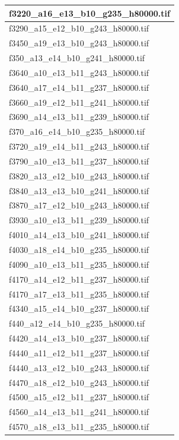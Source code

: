 \documentclass[12pt, twoside]{article}
\begin{document}
\begin{appendices}
\begin{longtable}{|l|}
		f3220\_a16\_e13\_b10\_g235\_h80000.tif \\ \hline 
		f3290\_a15\_e12\_b10\_g243\_h80000.tif \\ \hline 
		f3450\_a19\_e13\_b10\_g243\_h80000.tif \\ \hline 
		f350\_a13\_e14\_b10\_g241\_h80000.tif \\ \hline 
		f3640\_a10\_e13\_b11\_g243\_h80000.tif \\ \hline 
		f3640\_a17\_e14\_b11\_g237\_h80000.tif \\ \hline 
		f3660\_a19\_e12\_b11\_g241\_h80000.tif \\ \hline 
		f3690\_a14\_e13\_b11\_g239\_h80000.tif \\ \hline 
		f370\_a16\_e14\_b10\_g235\_h80000.tif \\ \hline 
		f3720\_a19\_e14\_b11\_g243\_h80000.tif \\ \hline 
		f3790\_a10\_e13\_b11\_g237\_h80000.tif \\ \hline 
		f3820\_a13\_e12\_b10\_g243\_h80000.tif \\ \hline 
		f3840\_a13\_e13\_b10\_g241\_h80000.tif \\ \hline 
		f3870\_a17\_e12\_b10\_g243\_h80000.tif \\ \hline 
		f3930\_a10\_e13\_b11\_g239\_h80000.tif \\ \hline 
		f4010\_a14\_e13\_b10\_g241\_h80000.tif \\ \hline 
		f4030\_a18\_e14\_b10\_g235\_h80000.tif \\ \hline 
		f4090\_a10\_e13\_b11\_g235\_h80000.tif \\ \hline 
		f4170\_a14\_e12\_b11\_g237\_h80000.tif \\ \hline 
		f4170\_a17\_e13\_b11\_g235\_h80000.tif \\ \hline 
		f4340\_a15\_e14\_b10\_g237\_h80000.tif \\ \hline 
		f440\_a12\_e14\_b10\_g235\_h80000.tif \\ \hline 
		f4420\_a14\_e13\_b10\_g237\_h80000.tif \\ \hline 
		f4440\_a11\_e12\_b11\_g237\_h80000.tif \\ \hline 
		f4440\_a13\_e12\_b10\_g243\_h80000.tif \\ \hline 
		f4470\_a18\_e12\_b10\_g243\_h80000.tif \\ \hline 
		f4500\_a15\_e12\_b11\_g237\_h80000.tif \\ \hline 
		f4560\_a14\_e13\_b11\_g241\_h80000.tif \\ \hline 
		f4570\_a18\_e13\_b11\_g235\_h80000.tif \\ \hline 

\end{longtable}
\end{appendices}
\end{document}
